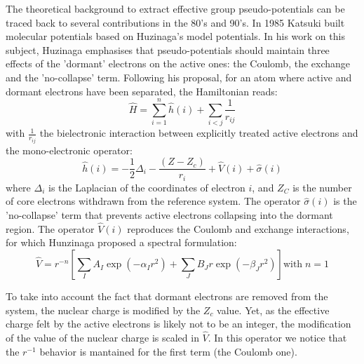 \documentclass[journal=jctcce,manuscript=article]{achemso}
\begin{document}
The theoretical background to extract effective group pseudo-potentials  can be traced back 
to several contributions in the 80's and 90's. In 1985 Katsuki built molecular potentials based on Huzinaga's model potentials.
 In his work on this subject, Huzinaga emphasises that pseudo-potentials should maintain three effects of the
'dormant' electrons on the active ones: the Coulomb, the exchange and the 'no-collapse' term.\cite{huzinaga_effective_1991}
Following his proposal, for an atom where active and dormant electrons have been separated, the Hamiltonian reads:
\begin{equation}
\label{eq:atomicHamiltonian}
\hat{H} = \sum_{i=1}^n \hat{h}(i) +\sum_{i<j}\frac{1}{r_{ij}}
\end{equation}
with $\frac{1}{r_{ij}}$ the bielectronic interaction
between explicitly treated active electrons and
the mono-electronic operator:
\begin{equation}
\label{eq:monoElectronicOperator}
\hat{h}(i) = -\frac{1}{2}\Delta_i - \frac{(Z-Z_c)}{r_i}+\hat{V}(i) + \hat{\sigma}(i)
\end{equation}
where $\Delta_i$ is the Laplacian of the coordinates of electron $i$, and 
$Z_C$ is the number of core electrons withdrawn from the reference system.
The operator $\hat{\sigma}(i)$ is the 'no-collapse' term that prevents active electrons
collapsing into the dormant region. The operator $\hat{V}(i)$ reproduces the 
Coulomb and exchange interactions, for which Hunzinaga proposed a spectral formulation:
\begin{equation}
\label{eq:HuzinagaMPVersion1Potential}
\hat{V} = r^{-n}\left[\sum_IA_I\exp(-\alpha_I r^2)+\sum_JB_Jr\exp(-\beta_J r^2)\right] \text{with}\;n=1
\end{equation}

To take into account the fact that dormant electrons are removed from the
system, the nuclear charge is modified by the $Z_c$ value.
Yet, as the effective charge felt by the active electrons is likely not to be an integer,
the modification of the value of the nuclear charge is scaled in $\hat{V}$.
In this operator we notice that the \(r^{-1}\) behavior is mantained for the first term 
(the Coulomb one).
\end{document}
